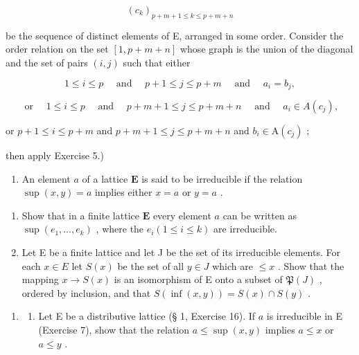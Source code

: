 \[
\left(c _ {k}\right) _ {p + m + 1 \leqslant k \leqslant p + m + n}
\]

be the sequence of distinct elements of E, arranged in some order. Consider the order relation on the set \([1, p + m + n]\) whose graph is the union of the diagonal and the set of pairs \((i, j)\) such that either

\[
1 \leqslant i \leqslant p \quad \text { and } \quad p + 1 \leqslant j \leqslant p + m \quad \text { and } \quad a _ {i} = b _ {j},
\]

\[
\text { or } \quad 1 \leqslant i \leqslant p \quad \text { and } \quad p + m + 1 \leqslant j \leqslant p + m + n \quad \text { and } \quad a _ {i} \in A (c _ {j}),
\]

or \(p + 1 \leqslant i \leqslant p + m\) and \(p + m + 1 \leqslant j \leqslant p + m + n\) and \(b_i \in \mathrm{A}(c_j)\) ;

then apply Exercise 5.)

\begin{enumerate}
\def\labelenumi{\arabic{enumi}.}
\setcounter{enumi}{6}
\tightlist
\item
  An element \(a\) of a lattice \(\mathbf{E}\) is said to be irreducible if the relation \(\sup (x, y) = a\) implies either \(x = a\) or \(y = a\) .
\end{enumerate}

\begin{enumerate}
\def\labelenumi{(\alph{enumi})}
\item
  Show that in a finite lattice \(\mathbf{E}\) every element \(a\) can be written as \(\sup (e_1, \ldots, e_k)\) , where the \(e_i (1 \leqslant i \leqslant k)\) are irreducible.
\item
  Let E be a finite lattice and let J be the set of its irreducible elements. For each \(x \in E\) let \(S(x)\) be the set of all \(y \in J\) which are \(\leqslant x\) . Show that the mapping \(x \to S(x)\) is an isomorphism of E onto a subset of \(\mathfrak{P}(J)\) , ordered by inclusion, and that \(S(\inf(x, y)) = S(x) \cap S(y)\) .
\end{enumerate}

\begin{enumerate}
\def\labelenumi{\arabic{enumi}.}
\setcounter{enumi}{7}
\tightlist
\item
  \begin{enumerate}
  \def\labelenumii{(\alph{enumii})}
  \tightlist
  \item
    Let E be a distributive lattice (§ 1, Exercise 16). If \(a\) is irreducible in E (Exercise 7), show that the relation \(a \leqslant \sup (x, y)\) implies \(a \leqslant x\) or \(a \leqslant y\) .
  \end{enumerate}
\end{enumerate}

